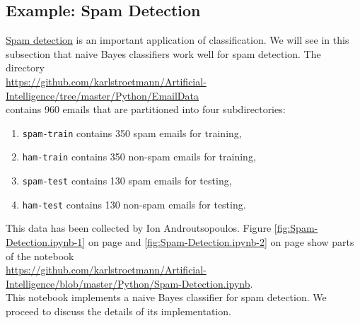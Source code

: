 \subsection{Example: Spam Detection}
\href{https://en.wikipedia.org/wiki/Naive_Bayes_spam_filtering}{Spam detection} is an important application of
classification.  We will see in this subsection that naive Bayes classifiers work well for spam detection.
The directory
\\[0.2cm]
\hspace*{1.3cm}
\href{https://github.com/karlstroetmann/Artificial-Intelligence/tree/master/Python/EmailData}{
https://github.com/karlstroetmann/Artificial-Intelligence/tree/master/Python/EmailData}
\\[0.2cm]
contains 960 emails that are partitioned into four subdirectories:
\begin{enumerate}
\item \texttt{spam-train} contains 350 spam emails for training,
\item \texttt{ham-train}  contains 350 non-spam emails for training,
\item \texttt{spam-test}  contains 130 spam emails for testing,
\item \texttt{ham-test}   contains 130 non-spam emails for testing.
\end{enumerate}
This data has been collected by Ion Androutsopoulos.  Figure \ref{fig:Spam-Detection.ipynb-1} on page
\pageref{fig:Spam-Detection.ipynb-1} and \ref{fig:Spam-Detection.ipynb-2} on page
\pageref{fig:Spam-Detection.ipynb-2} show parts of the notebook 
\\[0.2cm]
\hspace*{0.3cm}
\href{https://github.com/karlstroetmann/Artificial-Intelligence/blob/master/Python/Spam-Detection.ipynb}{
https://github.com/karlstroetmann/Artificial-Intelligence/blob/master/Python/Spam-Detection.ipynb}.
\\[0.2cm]
This notebook implements a naive Bayes classifier for spam detection.  We proceed to discuss the details of its
implementation.



